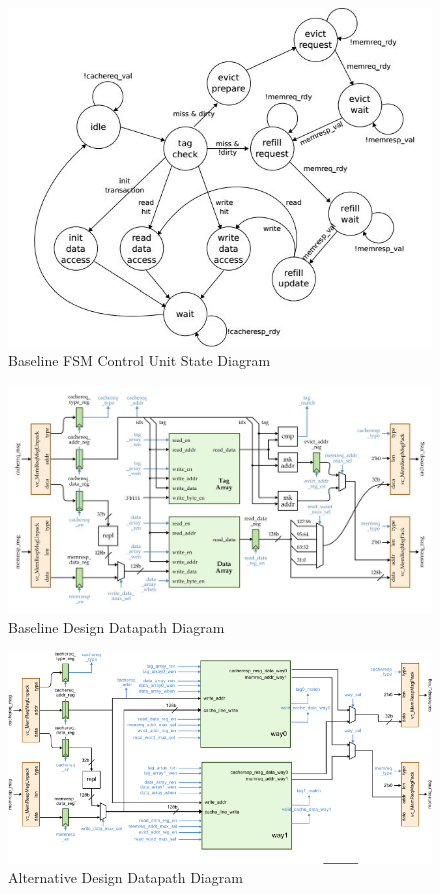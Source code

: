\documentclass[10pt]{article}
\begin{document}
\begin{figure}[b]
\centering
\includegraphics[scale=0.8]{state}
\caption{Baseline FSM Control Unit State Diagram}
\label{fig:state}
\end{figure}


\begin{figure}[b]
\centering
\includegraphics[scale=0.6]{baseline}
\caption{Baseline Design Datapath Diagram}
\label{fig:baseline}
\end{figure}



\begin{figure}[b]
\centering
\includegraphics[scale=0.8]{alt}
\caption{Alternative Design Datapath Diagram}
\label{fig:alt}
\end{figure}
\end{document}
